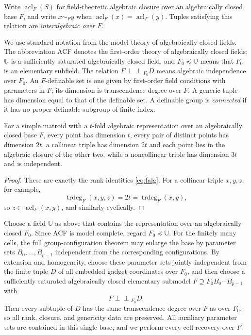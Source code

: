 \documentclass[11pt]{article}
\theoremstyle{definition}
\newcommand{\acl}{\operatorname{acl}}
\newcommand{\trdeg}{\operatorname{trdeg}}
\newcommand{\ind}{\mathrel{\perp\!\!\!\perp}}
\newcommand{\simF}{\mathrel{\sim_F}}
\begin{document}
Write $\acl_F(S)$ for field-theoretic algebraic closure over an algebraically closed base $F$, and write $x\simF y$ when $\acl_F(x)=\acl_F(y)$.  Tuples satisfying this relation are \emph{interalgebraic over $F$}.

We use standard notation from the model theory of algebraically closed fields.  The abbreviation ACF denotes the first-order theory of algebraically closed fields; $\mathbb U$ is a sufficiently saturated algebraically closed field, and $F_0\preceq\mathbb U$ means that $F_0$ is an elementary subfield.  The relation $F\ind_{F_0}D$ means algebraic independence over $F_0$.  An $F$-definable set is one given by first-order field conditions with parameters in $F$; its dimension is transcendence degree over $F$.  A generic tuple has dimension equal to that of the definable set.  A definable group is \emph{connected} if it has no proper definable subgroup of finite index.

\begin{lemma}\label{lem:full}
For a simple matroid with a $t$-fold algebraic representation over an algebraically closed base $F$, every point has dimension $t$, every pair of distinct points has dimension $2t$, a collinear triple has dimension $2t$ and each point lies in the algebraic closure of the other two, while a noncollinear triple has dimension $3t$ and is independent.
\end{lemma}
\begin{proof}
These are exactly the rank identities \eqref{eq:falg}.  For a collinear triple $x,y,z$, for example,
\[
\trdeg_F(x,y,z)=2t=\trdeg_F(x,y),
\]
so $z\in\acl_F(x,y)$, and similarly cyclically.
\end{proof}

Choose a field $\mathbb U$ as above that contains the representation over an algebraically closed $F_0$.  Since ACF is model complete, regard $F_0\preceq\mathbb U$.  For the finitely many cells, the full group-configuration theorem may enlarge the base by parameter sets $B_0,\ldots,B_{p-1}$ independent from the corresponding configurations.  By extension and homogeneity, choose these parameter sets jointly independent from the finite tuple $D$ of all embedded gadget coordinates over $F_0$, and then choose a sufficiently saturated algebraically closed elementary submodel $F\supseteq F_0B_0\cdots B_{p-1}$ with
\[
F\ind_{F_0}D.
\]
Then every subtuple of $D$ has the same transcendence degree over $F$ as over $F_0$, so all rank, closure, and genericity data are preserved.  All auxiliary parameter sets are contained in this single base, and we perform every cell recovery over $F$.
\end{document}
